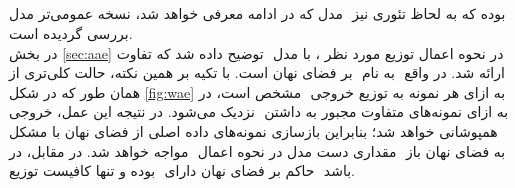 \subsection{\wae}
مدل  که در ادامه معرفی خواهد شد، نسخه عمومی‌تر مدل \aae{}‎ بوده که به لحاظ تئوری نیز بررسی گردیده است.\\
در بخش ‎\ref{sec:aae}‎ توضیح داده شد که تفاوت ‎\aae{}‎ با مدل ‎\vae{}‎، در نحوه اعمال توزیع مورد نظر بر فضای نهان است. با تکیه بر همین نکته، حالت کلی‌تری از ‎\aae{}‎ به نام ‎\wae{}‎ ارائه شد. در واقع همان طور که در شکل ‎‎\ref{fig:wae}‎ مشخص است، در ‎\vae{}‎ توزیع خروجی ‎\encoder{}‎به ازای هر نمونه به ‎\priordist{}‎ نزدیک می‌شود. در نتیجه این عمل، خروجی ‎\encoder{}‎ به ازای نمونه‌های متفاوت مجبور به داشتن همپوشانی خواهد شد؛ بنابراین بازسازی نمونه‌های داده اصلی از فضای نهان با مشکل مواجه خواهد شد. در مقابل، در ‎\wae{}‎ مقداری دست مدل در نحوه اعمال ‎‎\priordist{}‎ به فضای نهان باز بوده و تنها کافیست توزیع ‎\marginal{}‎ حاکم بر فضای نهان دارای ‎\priordist{}‎ باشد.\\
